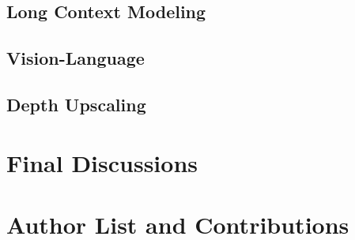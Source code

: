 \documentclass[numbers,sort&compress]{article}
\begin{document}
\subsection{Long Context Modeling}
\label{sec:long_context}


\subsection{Vision-Language}
\label{sec:vision_language}


\subsection{Depth Upscaling}
\label{sec:depth_upscaling}



% 

% 

\section{Final Discussions}
\label{sec:conclusion}


\newpage
\appendix

\section{Author List and Contributions}


% 

\clearpage
  
\end{document}
